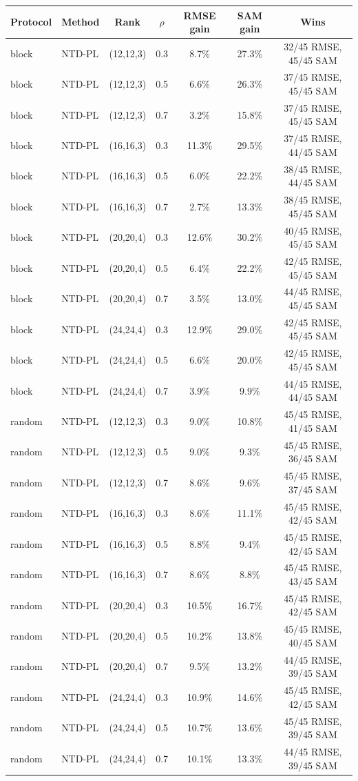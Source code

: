 \begin{tabular}{@{}l l c c c c c@{}}
\toprule
Protocol & Method & Rank & $\rho$ & RMSE gain & SAM gain & Wins\\
\midrule
block & NTD-PL & (12,12,3) & 0.3 & 8.7\% & 27.3\% & 32/45 RMSE, 45/45 SAM\\
block & NTD-PL & (12,12,3) & 0.5 & 6.6\% & 26.3\% & 37/45 RMSE, 45/45 SAM\\
block & NTD-PL & (12,12,3) & 0.7 & 3.2\% & 15.8\% & 37/45 RMSE, 45/45 SAM\\
block & NTD-PL & (16,16,3) & 0.3 & 11.3\% & 29.5\% & 37/45 RMSE, 44/45 SAM\\
block & NTD-PL & (16,16,3) & 0.5 & 6.0\% & 22.2\% & 38/45 RMSE, 44/45 SAM\\
block & NTD-PL & (16,16,3) & 0.7 & 2.7\% & 13.3\% & 38/45 RMSE, 45/45 SAM\\
block & NTD-PL & (20,20,4) & 0.3 & 12.6\% & 30.2\% & 40/45 RMSE, 45/45 SAM\\
block & NTD-PL & (20,20,4) & 0.5 & 6.4\% & 22.2\% & 42/45 RMSE, 45/45 SAM\\
block & NTD-PL & (20,20,4) & 0.7 & 3.5\% & 13.0\% & 44/45 RMSE, 45/45 SAM\\
block & NTD-PL & (24,24,4) & 0.3 & 12.9\% & 29.0\% & 42/45 RMSE, 45/45 SAM\\
block & NTD-PL & (24,24,4) & 0.5 & 6.6\% & 20.0\% & 42/45 RMSE, 45/45 SAM\\
block & NTD-PL & (24,24,4) & 0.7 & 3.9\% & 9.9\% & 44/45 RMSE, 44/45 SAM\\
random & NTD-PL & (12,12,3) & 0.3 & 9.0\% & 10.8\% & 45/45 RMSE, 41/45 SAM\\
random & NTD-PL & (12,12,3) & 0.5 & 9.0\% & 9.3\% & 45/45 RMSE, 36/45 SAM\\
random & NTD-PL & (12,12,3) & 0.7 & 8.6\% & 9.6\% & 45/45 RMSE, 37/45 SAM\\
random & NTD-PL & (16,16,3) & 0.3 & 8.6\% & 11.1\% & 45/45 RMSE, 42/45 SAM\\
random & NTD-PL & (16,16,3) & 0.5 & 8.8\% & 9.4\% & 45/45 RMSE, 42/45 SAM\\
random & NTD-PL & (16,16,3) & 0.7 & 8.6\% & 8.8\% & 45/45 RMSE, 43/45 SAM\\
random & NTD-PL & (20,20,4) & 0.3 & 10.5\% & 16.7\% & 45/45 RMSE, 42/45 SAM\\
random & NTD-PL & (20,20,4) & 0.5 & 10.2\% & 13.8\% & 45/45 RMSE, 40/45 SAM\\
random & NTD-PL & (20,20,4) & 0.7 & 9.5\% & 13.2\% & 44/45 RMSE, 39/45 SAM\\
random & NTD-PL & (24,24,4) & 0.3 & 10.9\% & 14.6\% & 45/45 RMSE, 42/45 SAM\\
random & NTD-PL & (24,24,4) & 0.5 & 10.7\% & 13.6\% & 45/45 RMSE, 39/45 SAM\\
random & NTD-PL & (24,24,4) & 0.7 & 10.1\% & 13.3\% & 44/45 RMSE, 39/45 SAM\\
\bottomrule
\end{tabular}
